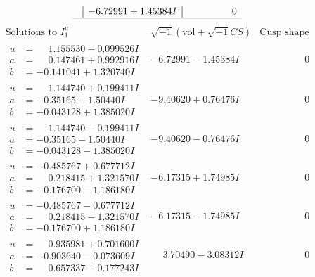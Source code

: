 \documentclass[1p]{elsarticle_modified}
\theoremstyle{definition}
\newcommand{\I}{\sqrt{-1}}
\begin{document}
$$\begin{array}{c|c|c}
 & -6.72991 + 1.45384 I & \phantom{-0.000000 } 0\\
 \hline 
 \end{array}$$\newpage$$\begin{array}{c|c|c}  
\text{Solutions to }I^u_{1}& \I (\text{vol} + \sqrt{-1}CS) & \text{Cusp shape}\\
 \hline 
\begin{aligned}
u &= \phantom{-}1.155530 - 0.099526 I \\
a &= \phantom{-}0.147461 + 0.992916 I \\
b &= -0.141041 + 1.320740 I\end{aligned}
 & -6.72991 - 1.45384 I & \phantom{-0.000000 } 0 \\ \hline\begin{aligned}
u &= \phantom{-}1.144740 + 0.199411 I \\
a &= -0.35165 + 1.50440 I \\
b &= -0.043128 + 1.385020 I\end{aligned}
 & -9.40620 + 0.76476 I & \phantom{-0.000000 } 0 \\ \hline\begin{aligned}
u &= \phantom{-}1.144740 - 0.199411 I \\
a &= -0.35165 - 1.50440 I \\
b &= -0.043128 - 1.385020 I\end{aligned}
 & -9.40620 - 0.76476 I & \phantom{-0.000000 } 0 \\ \hline\begin{aligned}
u &= -0.485767 + 0.677712 I \\
a &= \phantom{-}0.218415 + 1.321570 I \\
b &= -0.176700 - 1.186180 I\end{aligned}
 & -6.17315 + 1.74985 I & \phantom{-0.000000 } 0 \\ \hline\begin{aligned}
u &= -0.485767 - 0.677712 I \\
a &= \phantom{-}0.218415 - 1.321570 I \\
b &= -0.176700 + 1.186180 I\end{aligned}
 & -6.17315 - 1.74985 I & \phantom{-0.000000 } 0 \\ \hline\begin{aligned}
u &= \phantom{-}0.935981 + 0.701600 I \\
a &= -0.903640 - 0.073609 I \\
b &= \phantom{-}0.657337 - 0.177243 I\end{aligned}
 & \phantom{-}3.70490 - 3.08312 I & \phantom{-0.000000 } 0 \\ \hline\begin{aligned}

\end{aligned}
\end{array}$$
\end{document}
